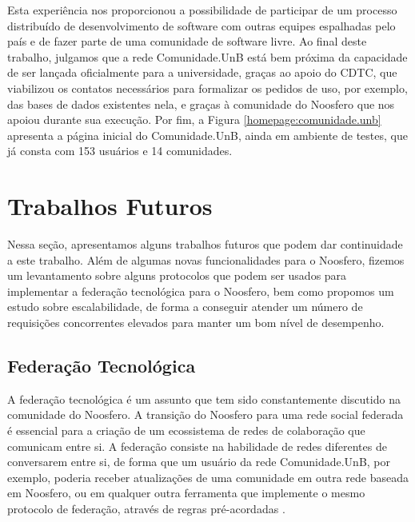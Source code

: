 Esta experiência nos proporcionou a possibilidade de participar de um processo
distribuído de desenvolvimento de software com outras equipes espalhadas pelo
país e de fazer parte de uma comunidade de software livre.
%
Ao final deste trabalho, julgamos que a rede Comunidade.UnB está bem próxima
da capacidade de ser lançada oficialmente para a universidade, graças ao
apoio do CDTC, que viabilizou os contatos necessários para formalizar os
pedidos de uso, por exemplo, das bases de dados existentes nela, e graças
à comunidade do Noosfero que nos apoiou durante sua execução.
%
Por fim, a Figura \ref{homepage:comunidade.unb} apresenta a página inicial do
Comunidade.UnB, ainda em ambiente de testes, que já consta com 153 usuários
e 14 comunidades.

\section{Trabalhos Futuros}
\label{sec:future-works}

Nessa seção, apresentamos alguns trabalhos futuros que podem dar continuidade a
este trabalho. Além de algumas novas funcionalidades para o Noosfero, fizemos
um levantamento sobre alguns protocolos que podem ser usados para implementar a
federação tecnológica para o Noosfero, bem como propomos um estudo sobre
escalabilidade, de forma a conseguir atender um número de requisições
concorrentes elevados para manter um bom nível de desempenho.

\subsection{Federação Tecnológica}

A federação tecnológica é um assunto que tem sido constantemente discutido
na comunidade do Noosfero. A transição do Noosfero para uma rede social federada
é essencial para a criação de um ecossistema de redes de colaboração que
comunicam entre si.
%
A federação consiste na habilidade de redes diferentes de conversarem entre si,
de forma que um usuário da rede Comunidade.UnB, por exemplo, poderia receber
atualizações de uma comunidade em outra rede baseada em Noosfero, ou em
qualquer outra ferramenta que implemente o mesmo protocolo de federação,
através de regras pré-acordadas \cite{prodomou2010}.

